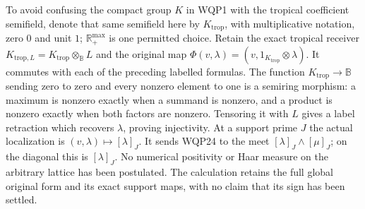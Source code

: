 To avoid confusing the compact group $K$ in WQP1 with the
tropical coefficient semifield, denote that same semifield here
by $K_{\mathrm{trop}}$, with multiplicative notation, zero $0$
and unit $1$; $\mathbb R_+^{\max}$ is one permitted choice.
Retain the exact tropical
receiver $K_{\mathrm{trop},L}=K_{\mathrm{trop}}\otimes_{\mathbb B}L$
and the original map
$\Phi(v,\lambda)=(v,1_{K_{\mathrm{trop}}}\otimes\lambda)$.
It commutes with each of the preceding labelled formulas.
The function $K_{\mathrm{trop}}\to\mathbb B$ sending zero to
zero and every nonzero element to one is a semiring morphism:
a maximum is nonzero exactly when a summand is nonzero, and
a product is nonzero exactly when both factors are nonzero.
Tensoring it with $L$ gives a label retraction which recovers
$\lambda$, proving injectivity. At a support prime
$J$ the actual localization is $(v,\lambda)\mapsto[\lambda]_J$.
It sends WQP24 to the meet $[\lambda]_J\wedge[\mu]_J$;
on the diagonal this is $[\lambda]_J$. No numerical positivity
or Haar measure on the arbitrary lattice has been postulated.
The calculation retains the full global original form and its
exact support maps, with no claim that its sign has been settled.
